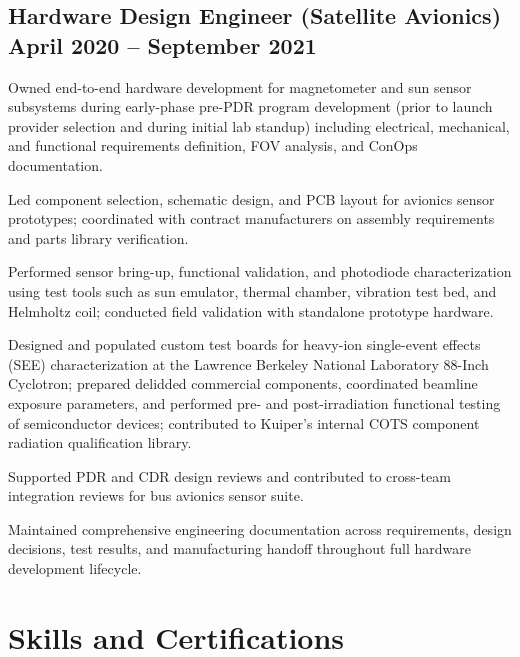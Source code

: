 \subsection{{Hardware Design Engineer (Satellite Avionics) \hfill April 2020 – September 2021}}
\begin{zitemize}
    \item Owned end-to-end hardware development for magnetometer and sun sensor subsystems during early-phase pre-PDR program development (prior to launch provider selection and during initial lab standup) including electrical, mechanical, and functional requirements definition, FOV analysis, and ConOps documentation.
    \item Led component selection, schematic design, and PCB layout for avionics sensor prototypes; coordinated with contract manufacturers on assembly requirements and parts library verification.
    \item Performed sensor bring-up, functional validation, and photodiode characterization using test tools such as sun emulator, thermal chamber, vibration test bed, and Helmholtz coil; conducted field validation with standalone prototype hardware.
    \item Designed and populated custom test boards for heavy-ion single-event effects (SEE) characterization at the Lawrence Berkeley National Laboratory 88-Inch Cyclotron; prepared delidded commercial components, coordinated beamline exposure parameters, and performed pre- and post-irradiation functional testing of semiconductor devices; contributed to Kuiper's internal COTS component radiation qualification library.
    \item Supported PDR and CDR design reviews and contributed to cross-team integration reviews for bus avionics sensor suite.
    \item Maintained comprehensive engineering documentation across requirements, design decisions, test results, and manufacturing handoff throughout full hardware development lifecycle.
\end{zitemize}
\vspace{6pt}


\section{Skills and Certifications}

